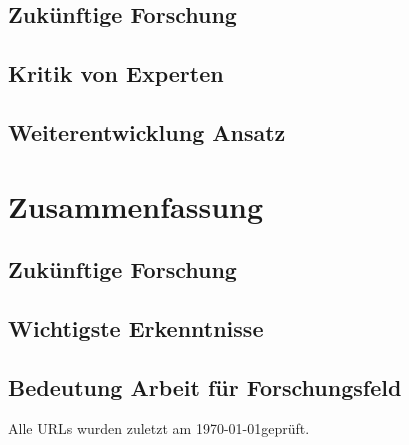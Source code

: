 \documentclass[
  ngerman,
  a4paper,  %
  twoside,  %
  bibliography=totoc,
  headsepline,
  cleardoublepage=empty,
  parskip=half,
  draft=false
]{scrbook}
\begin{document}

\section{Zukünftige Forschung}
\section{Kritik von Experten}
\section{Weiterentwicklung Ansatz}

\chapter{Zusammenfassung}
\section{Zukünftige Forschung}
\section{Wichtigste Erkenntnisse}
\section{Bedeutung Arbeit für Forschungsfeld}

\printbibliography

Alle URLs wurden zuletzt am \today \space geprüft.

\appendix


\pagestyle{empty}
\renewcommand*{\chapterpagestyle}{empty}
\Versicherung
\end{document}
